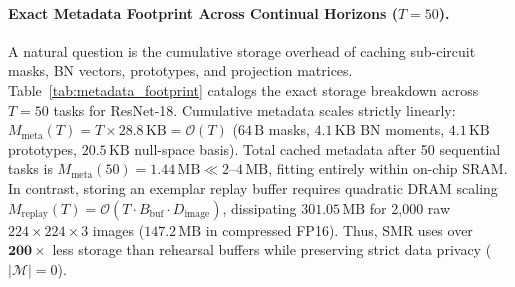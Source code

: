 \documentclass{article}
\begin{document}
\paragraph{Exact Metadata Footprint Across Continual Horizons ($T=50$).}
A natural question is the cumulative storage overhead of caching sub-circuit masks, BN vectors, prototypes, and projection matrices. Table~\ref{tab:metadata_footprint} catalogs the exact storage breakdown across $T=50$ tasks for ResNet-18. Cumulative metadata scales strictly linearly: $M_{\text{meta}}(T) = T \times 28.8\,\text{KB} = \mathcal{O}(T)$ ($64\,\text{B}$ masks, $4.1\,\text{KB}$ BN moments, $4.1\,\text{KB}$ prototypes, $20.5\,\text{KB}$ null-space basis). Total cached metadata after 50 sequential tasks is $M_{\text{meta}}(50) = 1.44\,\text{MB} \ll 2\text{--}4\,\text{MB}$, fitting entirely within on-chip SRAM. In contrast, storing an exemplar replay buffer requires quadratic DRAM scaling $M_{\text{replay}}(T) = \mathcal{O}(T \cdot B_{\text{buf}} \cdot D_{\text{image}})$, dissipating $301.05\,\text{MB}$ for 2{,}000 raw $224 \times 224 \times 3$ images ($147.2\,\text{MB}$ in compressed FP16). Thus, SMR uses over $\mathbf{200\times}$ less storage than rehearsal buffers while preserving strict data privacy ($|\mathcal{M}|=0$).

\begin{table}[ht]
\centering
\caption{\textbf{Exact Metadata Memory Accounting Across Continual Horizons} ($T=50$ Tasks, ResNet-18, 100 Classes).}
\label{tab:metadata_footprint}
\vskip 0.005in
\end{table}
\end{document}
